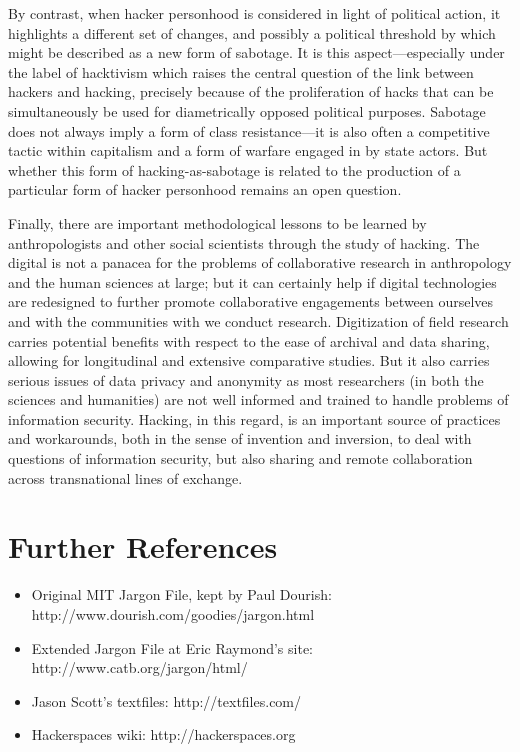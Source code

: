 \documentclass[10pt,letter,oneside]{scrartcl}
\begin{document}
By contrast, when hacker personhood is considered in light of political action,
it highlights a different set of changes, and possibly a political threshold by
which might be described as a new form of sabotage.  It is this
aspect---especially under the label of hacktivism which raises the central
question of the link between hackers and hacking, precisely because of the
proliferation of hacks that can be simultaneously be used for diametrically
opposed political purposes.  Sabotage does not always imply a form of class
resistance---it is also often a competitive tactic within capitalism and a form
of warfare engaged in by state actors.  But whether this form of
hacking-as-sabotage is related to the production of a particular form of hacker
personhood remains an open question. 

Finally, there are important methodological lessons to be learned by
anthropologists and other social scientists through the study of hacking. The
digital is not a panacea for the problems of collaborative research in
anthropology and the human sciences at large; but it can certainly help if
digital technologies are redesigned to further promote collaborative engagements
between ourselves and with the communities with we conduct research. Digitization
of field research carries potential benefits with respect to the ease of
archival and data sharing, allowing for longitudinal and extensive comparative
studies.  But it also carries serious issues of data privacy and anonymity as
most researchers (in both the sciences and humanities) are not well informed and
trained to handle problems of information security.  Hacking, in this regard, is
an important source of practices and workarounds, both in the sense of invention
and inversion, to deal with questions of information security, but also sharing
and remote collaboration across transnational lines of exchange.


\section*{Further References}

\begin{itemize}
\item  Original MIT Jargon File, kept by Paul Dourish:
  http://www.dourish.com/goodies/jargon.html 
\item  Extended Jargon File at Eric Raymond's site:
  http://www.catb.org/jargon/html/
\item Jason Scott's textfiles:
  http://textfiles.com/ 
\item Hackerspaces wiki: 
  http://hackerspaces.org
\end{itemize}

% 

\printbibliography 
\end{document}
